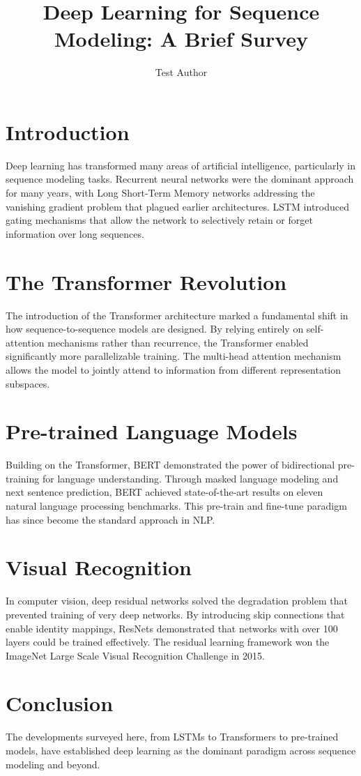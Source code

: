 \documentclass{article}
\title{Deep Learning for Sequence Modeling: A Brief Survey}
\author{Test Author}
\begin{document}
\maketitle

\section{Introduction}

Deep learning has transformed many areas of artificial intelligence, particularly in sequence modeling tasks.
Recurrent neural networks were the dominant approach for many years, with Long Short-Term Memory networks \citep{hochreiter1997long} addressing the vanishing gradient problem that plagued earlier architectures.
LSTM introduced gating mechanisms that allow the network to selectively retain or forget information over long sequences.

\section{The Transformer Revolution}

The introduction of the Transformer architecture \citep{vaswani2017attention} marked a fundamental shift in how sequence-to-sequence models are designed.
By relying entirely on self-attention mechanisms rather than recurrence, the Transformer enabled significantly more parallelizable training.
The multi-head attention mechanism allows the model to jointly attend to information from different representation subspaces.

\section{Pre-trained Language Models}

Building on the Transformer, BERT \citep{devlin2019bert} demonstrated the power of bidirectional pre-training for language understanding.
Through masked language modeling and next sentence prediction, BERT achieved state-of-the-art results on eleven natural language processing benchmarks.
This pre-train and fine-tune paradigm has since become the standard approach in NLP.

\section{Visual Recognition}

In computer vision, deep residual networks \citep{he2016deep} solved the degradation problem that prevented training of very deep networks.
By introducing skip connections that enable identity mappings, ResNets demonstrated that networks with over 100 layers could be trained effectively.
The residual learning framework won the ImageNet Large Scale Visual Recognition Challenge in 2015.

\section{Conclusion}

The developments surveyed here, from LSTMs to Transformers to pre-trained models, have established deep learning as the dominant paradigm across sequence modeling and beyond.



\end{document}
